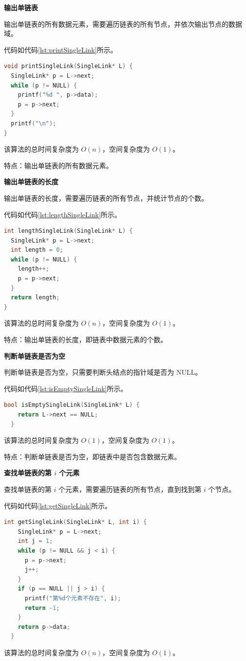 \documentclass[lang=cn,newtx,10pt,scheme=chinese]{../elegantbook}
\begin{document}
\textbf{输出单链表}

输出单链表的所有数据元素，需要遍历链表的所有节点，并依次输出节点的数据域。

代码如代码\ref{lst:printSingleLink}所示。

\begin{lstlisting}[language=C++, caption={输出单链表示例代码}, label={lst:printSingleLink}]
void printSingleLink(SingleLink* L) {
  SingleLink* p = L->next;
  while (p != NULL) {
    printf("%d ", p->data);
    p = p->next;
  }
  printf("\n");
}
\end{lstlisting}
该算法的总时间复杂度为 $O(n)$，空间复杂度为 $O(1)$。

特点：输出单链表的所有数据元素。

\textbf{输出单链表的长度}

输出单链表的长度，需要遍历链表的所有节点，并统计节点的个数。

代码如代码\ref{lst:lengthSingleLink}所示。

\begin{lstlisting}[language=C++, caption={输出单链表长度示例代码}, label={lst:lengthSingleLink}]
int lengthSingleLink(SingleLink* L) {
  SingleLink* p = L->next;
  int length = 0;
  while (p != NULL) {
    length++;
    p = p->next;
  }
  return length;
}
\end{lstlisting}
该算法的总时间复杂度为 $O(n)$，空间复杂度为 $O(1)$。

特点：输出单链表的长度，即链表中数据元素的个数。

\textbf{判断单链表是否为空}

判断单链表是否为空，只需要判断头结点的指针域是否为 NULL。

代码如代码\ref{lst:isEmptySingleLink}所示。

\begin{lstlisting}[language=C++, caption={判断单链表是否为空示例代码}, label={lst:isEmptySingleLink}]
  bool isEmptySingleLink(SingleLink* L) {
    return L->next == NULL;
  }
  \end{lstlisting}
  该算法的总时间复杂度为 $O(1)$，空间复杂度为 $O(1)$。

  特点：判断单链表是否为空，即链表中是否包含数据元素。

\textbf{查找单链表的第 $i$ 个元素}

查找单链表的第 $i$ 个元素，需要遍历链表的所有节点，直到找到第 $i$ 个节点。

代码如代码\ref{lst:getSingleLink}所示。

\begin{lstlisting}[language=C++, caption={查找单链表的第 $i$ 个元素示例代码}, label={lst:getSingleLink}]
  int getSingleLink(SingleLink* L, int i) {
    SingleLink* p = L->next;
    int j = 1;
    while (p != NULL && j < i) {
      p = p->next;
      j++;
    }
    if (p == NULL || j > i) {
      printf("第%d个元素不存在", i);
      return -1;
    }
    return p->data;
  }
\end{lstlisting}
该算法的总时间复杂度为 $O(n)$，空间复杂度为 $O(1)$。
\end{document}
